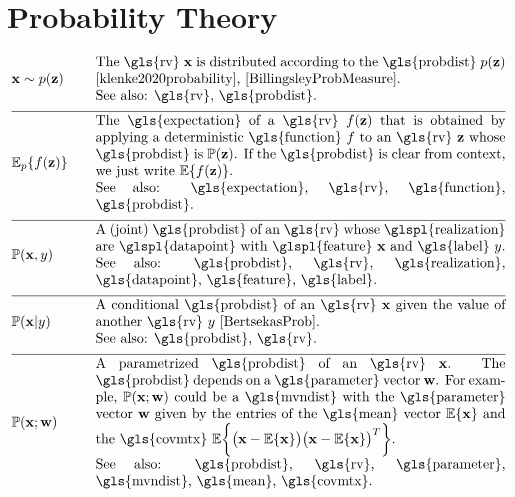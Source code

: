 \newpage
\section*{Probability Theory} 
\begin{align}
	&\featurevec \sim p(\vz)  &\quad & \parbox{.85\textwidth}{The \gls{rv} $\featurevec$ is distributed according to 
		the \gls{probdist} $p(\vz)$ \cite{klenke2020probability}, \cite{BillingsleyProbMeasure}.
		\\ See also: \gls{rv}, \gls{probdist}.}  \nonumber \\[2mm] \hline \nonumber\\[-5mm]  
	&\expect_{p} \{ f(\datapoint) \}  &\quad & \parbox{.85\textwidth}{The \gls{expectation} of a \gls{rv} $f(\datapoint)$ that 
		is obtained by applying a deterministic \gls{function} $f$ to an \gls{rv}
		$\datapoint$ whose \gls{probdist} is $\prob{\datapoint}$. If the \gls{probdist} is clear from context, 
		we just write $\expect \{ f(\datapoint) \}$. 
		\\ See also: \gls{expectation}, \gls{rv}, \gls{function}, \gls{probdist}.}  \nonumber \\[2mm] \hline \nonumber\\[-5mm]
	&\prob{\featurevec,\truelabel} &\quad & \parbox{.85\textwidth}{A (joint) \gls{probdist} of an \gls{rv} 
		whose \glspl{realization} are \glspl{datapoint} with \glspl{feature} $\featurevec$ and \gls{label} $\truelabel$.
		\\ See also: \gls{probdist}, \gls{rv}, \gls{realization}, \gls{datapoint}, \gls{feature}, 
		\gls{label}.} \nonumber \\[2mm] \hline \nonumber\\[-5mm]
	&\prob{\featurevec|\truelabel} &\quad & \parbox{.85\textwidth}{A conditional \gls{probdist} of an \gls{rv} 
		$\featurevec$ given the value of another \gls{rv} $\truelabel$ \cite[Sec.\ 3.5]{BertsekasProb}. 
		\\ See also: \gls{probdist}, \gls{rv}. } \nonumber \\[2mm] \hline \nonumber\\[-5mm]
	&\prob{\featurevec;\weights} &\quad & \parbox{.85\textwidth}{A parametrized \gls{probdist} of an \gls{rv} $\featurevec$. 
		The \gls{probdist} depends on a \gls{parameter} vector $\weights$. For example, $\prob{\featurevec;\weights}$ could be a 
		\gls{mvndist} with the \gls{parameter} vector $\weights$ given by the entries of the \gls{mean} vector $\expect \{ \featurevec \}$ 
		and the \gls{covmtx} $\expect \bigg \{ \big( \featurevec - \expect \{ \featurevec \}\big) \big( \featurevec - \expect \{ \featurevec \}\big)^{T}  \bigg\}$.
		\\ See also: \gls{probdist}, \gls{rv}, \gls{parameter}, \gls{mvndist}, \gls{mean}, \gls{covmtx}.} \nonumber  
\end{align} 
